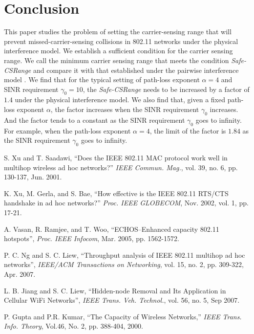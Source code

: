 \documentclass[conference]{IEEEtran}
\begin{document}
\section{Conclusion}\label{conclusion}

This paper studies the problem of setting the carrier-sensing range
that will prevent missed-carrier-sensing collisions in 802.11
networks under the physical interference model. We establish a
suff\/icient condition for the carrier sensing range. We call the
minimum carrier sensing range that meets the condition
\emph{Safe-CSRange} and compare it with that established under the
pairwise interference model \cite{LiBin}. We find that for the
typical setting of path-loss exponent $\alpha=4$ and SINR
requirement $\gamma_0=10$, the \emph{Safe-CSRange} needs to be
increased by a factor of $1.4$ under the physical interference
model. We also find that, given a fixed path-loss exponent $\alpha$,
the factor increases when the SINR requirement $\gamma_0$ increases.
And the factor tends to a constant as the SINR requirement
$\gamma_0$ goes to infinity. For example, when the path-loss
exponent $\alpha=4$, the limit of the factor is $1.84$ as the SINR
requirement $\gamma_0$ goes to infinity.



\begin{thebibliography}{99}
\providecommand{\url}[1]{#1}

S. Xu and T. Saadawi, ``Does the IEEE 802.11 MAC protocol work well
in multihop wireless ad hoc networks?'' \textit{IEEE Commun. Mag.},
vol. 39, no. 6, pp. 130-137, Jun. 2001.

K. Xu, M. Gerla, and S. Bae, ``How effective is the IEEE 802.11
RTS/CTS handshake in ad hoc networks?'' \textit{Proc. IEEE
GLOBECOM}, Nov. 2002, vol. 1, pp. 17-21.

A. Vasan, R. Ramjee, and T. Woo, ``ECHOS--Enhanced capacity 802.11
hotspots'', \textit{Proc. IEEE Infocom}, Mar. 2005, pp. 1562-1572.

P. C. Ng and S. C. Liew, ``Throughput analysis of IEEE 802.11
multihop ad hoc networks'', \textit{IEEE/ACM Transactions on
Networking}, vol. 15, no. 2, pp. 309-322, Apr. 2007.

L. B. Jiang and S. C. Liew, ``Hidden-node Removal and Its
Application in Cellular WiFi Networks'', \textit{IEEE Trans. Veh.
Technol.}, vol. 56, no. 5, Sep 2007.

P. Gupta and P.R. Kumar, ``The Capacity of Wireless Networks,''
\textit{IEEE Trans. Info. Theory}, Vol.46, No. 2, pp. 388-404, 2000.
\end{thebibliography}
\end{document}

